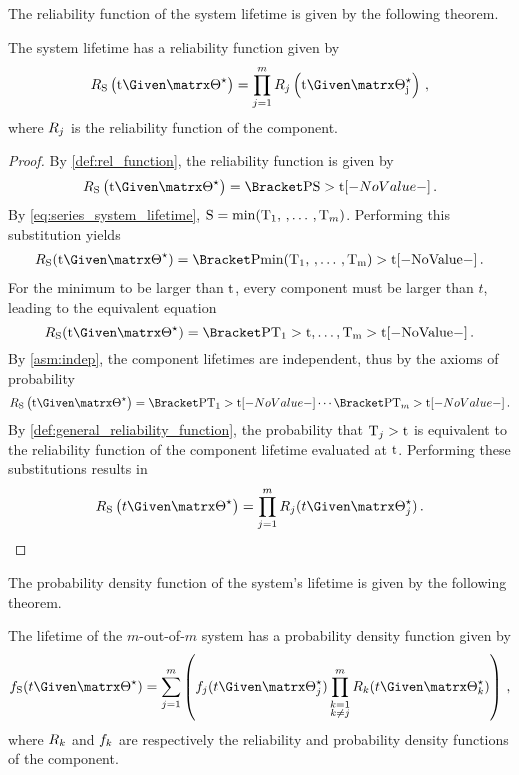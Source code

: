 \documentclass[../main.tex]{subfiles}
\begin{document}
The reliability function of the system lifetime is given by the following 
theorem.
\begin{theorem}
\label{thm:series_reliability_function}
The system lifetime has a reliability function given by
\begin{equation}
\label{eq:series_reliability_function}
    \srv_{\sv}\left(\ti \Given \tparam\sysparam\right) = \prod_{j=1}^{m} \srv_j\left(\ti \Given \tparam\sysparam_j\right)\,,
\end{equation}
where $R_j$ is the reliability function of the \jth component.
\end{theorem}
\begin{proof}
By \cref{def:rel_function}, the reliability function is given by
\begin{equation}
    \srv_{\sv}\left(\ti \Given \tparam\sysparam\right) = \Prob{\sv > \ti}\,.
\end{equation}
By \cref{eq:series_system_lifetime}, $\mathrm{S} = \min(\mathrm{T}_1,\,,\ldots\,,\mathrm{T}_m)$. Performing this substitution yields
\begin{align}
    \srv_{\sv}(\ti \Given \tparam{\sysparam}) = \Prob{\min(\cv_1,\,,\ldots\,, \cv_m) > \ti}\,.
\end{align}
For the minimum to be larger than $\rm{t}$, every component must be larger than $t$, leading to the equivalent equation
\begin{equation}
    \srv_{\sv}(\ti \Given \tparam{\sysparam}) = \Prob{\cv_1 > \ti, \ldots, \cv_m > \ti}\,.
\end{equation}
By \cref{asm:indep}, the component lifetimes are independent, thus by the axioms of probability
\begin{equation}
    \srv_{\sv}\left(\ti \Given \tparam{\sysparam}\right) = \Prob{\cv_1 > \ti} \cdots \Prob{\cv_m > \ti}\,.
\end{equation}
By \cref{def:general_reliability_function}, the probability that $\mathrm{T}_j > \rm{t}$ is equivalent to the reliability function of the \jth component lifetime evaluated at $\rm{t}$. Performing these substitutions results in
\begin{equation}
    \srv_{\sv}\left(t \Given \tparam{\sysparam}\right) = \prod_{j=1}^{m} \srv_j(t \Given \tparam{\sysparam}_j)\,.
\end{equation}
\end{proof}
The probability density function of the system's lifetime is given by the following theorem.
\begin{theorem}
\label{thm:series_pdf_function}
The lifetime of the $m$-out-of-$m$ system has a probability density function given by
\begin{equation}
\label{eq:series_pdf_function}
    \spdf(t \Given \tparam\sysparam) = \sum_{j=1}^{m} \left(\pdf_j(t \Given \tparam{\sysparam}_j)
    \prod_{\substack{k=1\\k \neq j}}^{m} \srv_k(t \Given \tparam{\sysparam}_k)\right )\,,
\end{equation}
where $R_k$ and $f_k$ are respectively the reliability and probability 
density functions of the \kth component.
\end{theorem}
\end{document}
